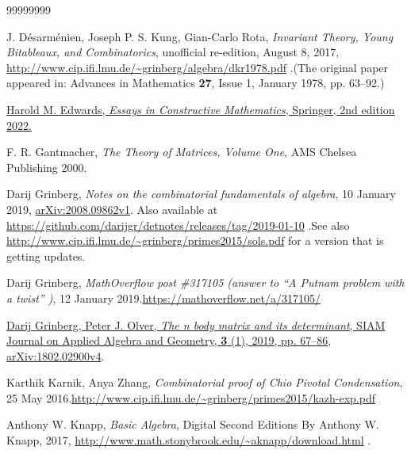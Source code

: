 \documentclass[numbers=enddot,12pt,final,onecolumn,notitlepage]{scrartcl}%
\theoremstyle{definition}
\begin{document}
\begin{thebibliography}{99999999}                                                                                         %


J. D\'{e}sarm\'{e}nien, Joseph P. S. Kung,
Gian-Carlo Rota, \textit{Invariant Theory, Young Bitableaux, and
Combinatorics}, unofficial re-edition, August 8, 2017,
\url{http://www.cip.ifi.lmu.de/~grinberg/algebra/dkr1978.pdf} .\newline(The
original paper appeared in: Advances in Mathematics \textbf{27}, Issue 1,
January 1978, pp. 63--92.)

%
\href{http://doi.org/10.1007/978-3-030-98558-5}{Harold M. Edwards,
\textit{Essays in Constructive Mathematics}, Springer, 2nd edition 2022.}

F. R. Gantmacher, \textit{The Theory of Matrices,
Volume One}, AMS Chelsea Publishing 2000.

Darij Grinberg, \textit{Notes on the combinatorial
fundamentals of algebra}, 10 January 2019,
\href{https://arxiv.org/abs/2008.09862v1}{arXiv:2008.09862v1}. \newline Also
available at \url{https://github.com/darijgr/detnotes/releases/tag/2019-01-10}
.\newline See also
\url{http://www.cip.ifi.lmu.de/~grinberg/primes2015/sols.pdf} for a version
that is getting updates.

Darij Grinberg, \textit{MathOverflow post \#317105
(answer to \textquotedblleft A Putnam problem with a twist\textquotedblright%
)}, 12 January 2019.\newline\url{https://mathoverflow.net/a/317105/}

\href{https://doi.org/10.1137/18M1175410}{Darij
Grinberg, Peter J. Olver, \textit{The n body matrix and its determinant}, SIAM
Journal on Applied Algebra and Geometry, \textbf{3} (1), 2019, pp. 67--86},
\href{https://arxiv.org/abs/1802.02900v4}{arXiv:1802.02900v4}.

Karthik Karnik, Anya Zhang, \textit{Combinatorial
proof of Chio Pivotal Condensation}, 25 May 2016.\newline\url{http://www.cip.ifi.lmu.de/~grinberg/primes2015/kazh-exp.pdf}

Anthony W. Knapp, \textit{Basic Algebra}, Digital
Second Editions By Anthony W. Knapp, 2017,
\url{http://www.math.stonybrook.edu/~aknapp/download.html} .


\end{thebibliography}
\end{document}
